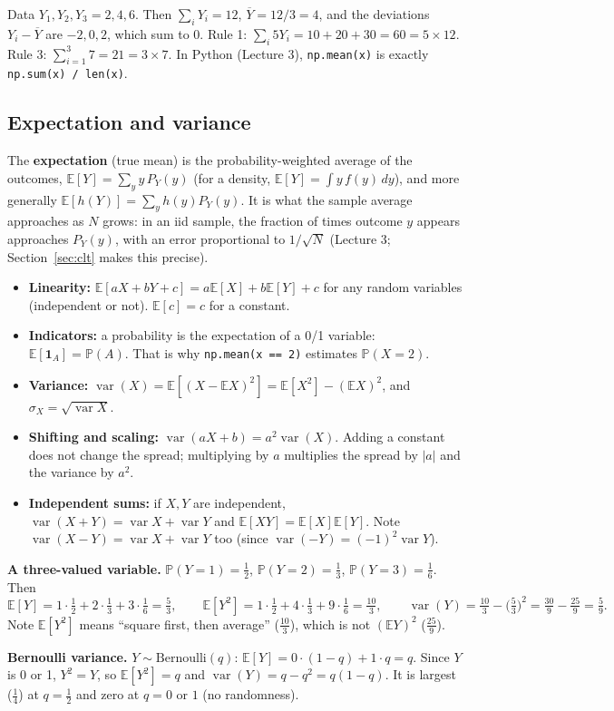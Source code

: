 \documentclass[11pt]{article}
\newcommand{\E}{\mathbb{E}}
\newcommand{\Var}{\operatorname{var}}
\renewcommand{\P}{\mathbb{P}}
\newcommand{\Bern}{\text{Bernoulli}}
\newcommand{\py}[1]{\texttt{#1}}
\newcommand{\Ybar}{\overline{Y}}
\begin{document}
\begin{examplebox}[title={Example}]
Data $Y_1,Y_2,Y_3=2,4,6$. Then $\sum_iY_i=12$, $\Ybar=12/3=4$, and the deviations $Y_i-\Ybar$ are $-2,0,2$, which sum to $0$.
Rule 1: $\sum_i 5Y_i=10+20+30=60=5\times12$. Rule 3: $\sum_{i=1}^3 7=21=3\times7$.
In Python (Lecture 3), \py{np.mean(x)} is exactly \py{np.sum(x) / len(x)}.
\end{examplebox}

\subsection{Expectation and variance}
The \textbf{expectation} (true mean) is the probability-weighted average of the outcomes,
$\E[Y]=\sum_y y\,P_Y(y)$ (for a density, $\E[Y]=\int y\,f(y)\,dy$), and more generally $\E[h(Y)]=\sum_y h(y)P_Y(y)$.
It is what the sample average approaches as $N$ grows: in an iid sample, the fraction of times outcome $y$ appears approaches $P_Y(y)$, with
an error proportional to $1/\sqrt N$ (Lecture 3; Section~\ref{sec:clt} makes this precise).
\begin{itemize}[leftmargin=*,itemsep=2pt]
\item \textbf{Linearity:} $\E[aX+bY+c]=a\E[X]+b\E[Y]+c$ for any random variables (independent or not). $\E[c]=c$ for a constant.
\item \textbf{Indicators:} a probability is the expectation of a 0/1 variable: $\E[\mathbf 1_A]=\P(A)$. That is why \py{np.mean(x == 2)}
estimates $\P(X=2)$.
\item \textbf{Variance:} $\Var(X)=\E[(X-\E X)^2]=\E[X^2]-(\E X)^2$, and $\sigma_X=\sqrt{\Var X}$.
\item \textbf{Shifting and scaling:} $\Var(aX+b)=a^2\Var(X)$. Adding a constant does not change the spread; multiplying by $a$
multiplies the spread by $|a|$ and the variance by $a^2$.
\item \textbf{Independent sums:} if $X,Y$ are independent, $\Var(X+Y)=\Var X+\Var Y$ and $\E[XY]=\E[X]\E[Y]$.
Note $\Var(X-Y)=\Var X+\Var Y$ too (since $\Var(-Y)=(-1)^2\Var Y$).
\end{itemize}

\begin{examplebox}[title={Examples (Lectures 5--6)}]
\textbf{A three-valued variable.} $\P(Y{=}1)=\tfrac12$, $\P(Y{=}2)=\tfrac13$, $\P(Y{=}3)=\tfrac16$. Then
\[
\E[Y]=1\cdot\tfrac12+2\cdot\tfrac13+3\cdot\tfrac16=\tfrac53,\qquad
\E[Y^2]=1\cdot\tfrac12+4\cdot\tfrac13+9\cdot\tfrac16=\tfrac{10}3,\qquad
\Var(Y)=\tfrac{10}3-\big(\tfrac53\big)^2=\tfrac{30}{9}-\tfrac{25}{9}=\tfrac59 .
\]
Note $\E[Y^2]$ means ``square first, then average'' ($\tfrac{10}{3}$), which is not $(\E Y)^2$ ($\tfrac{25}{9}$).

\textbf{Bernoulli variance.} $Y\sim\Bern(q)$: $\E[Y]=0\cdot(1-q)+1\cdot q=q$. Since $Y$ is 0 or 1, $Y^2=Y$, so $\E[Y^2]=q$ and
$\Var(Y)=q-q^2=q(1-q)$. It is largest ($\tfrac14$) at $q=\tfrac12$ and zero at $q=0$ or $1$ (no randomness).
\end{examplebox}
\end{document}
